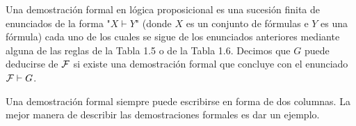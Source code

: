 \documentclass[12pt,a4paper]{book}
\newcommand{\comillas}[1]{"#1"}
\begin{document}
    \begin{definicion}\label{def:demostracion-formal}
        Una demostración formal en lógica proposicional es una sucesión finita de enunciados de la forma \comillas{$X\vdash Y$}
        (donde $X$ es un conjunto de fórmulas e $Y$ es una fórmula) cada uno de los cuales se sigue de los enunciados anteriores
        mediante alguna de las reglas de la Tabla 1.5 o de la Tabla 1.6. Decimos que $G$ puede deducirse de $\mathcal{F}$ si existe una
        demostración formal que concluye con el enunciado $\mathcal{F}\vdash G$.
    \end{definicion}

    Una demostración formal siempre puede escribirse en forma de dos columnas. La mejor manera de describir las demostraciones
    formales es dar un ejemplo.
\end{document}

